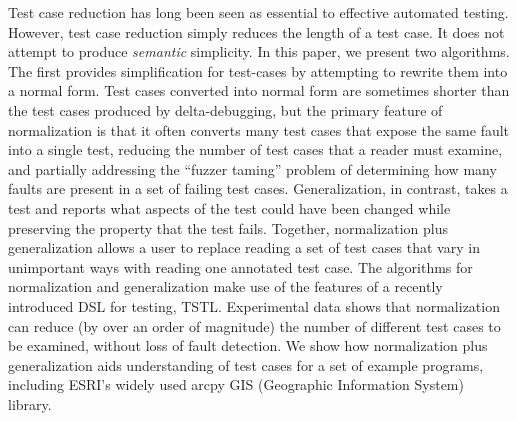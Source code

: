 Test case reduction has long been seen as essential to effective automated testing.  However, test case reduction simply reduces the length of a test case.  It does not attempt to produce \emph{semantic} simplicity.  In this paper, we present two algorithms.  The first provides simplification for test-cases by attempting to rewrite them into a normal form.  Test cases converted into normal form are sometimes shorter than the test cases produced by delta-debugging, but the primary feature of normalization is that it often converts many test cases that expose the same fault into a single test, reducing the number of test cases that a reader must examine, and partially addressing the ``fuzzer taming'' problem of determining how many faults are present in a set of failing test cases.  Generalization, in contrast, takes a test and reports what aspects of the test could have been changed while preserving the property that the test fails.  Together, normalization plus generalization allows a user to replace reading a set of test cases that vary in unimportant ways with reading one annotated test case.  The algorithms for normalization and generalization make use of the features of a recently introduced DSL for testing, TSTL.  Experimental data shows that normalization can reduce (by over an order of magnitude) the number of different test cases to be examined, without loss of fault detection.  We show how normalization plus generalization aids understanding of test cases for a set of example programs, including ESRI's widely used arcpy GIS (Geographic Information System) library.
